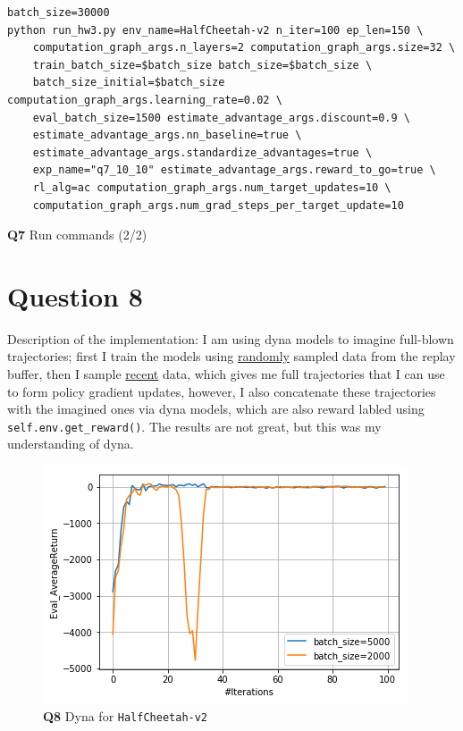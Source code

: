 \documentclass[11pt]{article}
\begin{document}
\begin{listing}[htbp]
\begin{verbatim}
batch_size=30000
python run_hw3.py env_name=HalfCheetah-v2 n_iter=100 ep_len=150 \
    computation_graph_args.n_layers=2 computation_graph_args.size=32 \
    train_batch_size=$batch_size batch_size=$batch_size \
    batch_size_initial=$batch_size computation_graph_args.learning_rate=0.02 \
    eval_batch_size=1500 estimate_advantage_args.discount=0.9 \
    estimate_advantage_args.nn_baseline=true \
    estimate_advantage_args.standardize_advantages=true \
    exp_name="q7_10_10" estimate_advantage_args.reward_to_go=true \
    rl_alg=ac computation_graph_args.num_target_updates=10 \
    computation_graph_args.num_grad_steps_per_target_update=10
\end{verbatim}
\caption{\textbf{Q7} Run commands (2/2)}
\end{listing}

\clearpage
\section{Question 8}
\label{sec:orgb553675}
Description of the implementation: I am using dyna models to imagine full-blown trajectories; first I train the models using \uline{randomly} sampled data from the replay buffer, then I sample \uline{recent} data, which gives me full trajectories that I can use to form policy gradient updates, however, I also concatenate these trajectories with the imagined ones via dyna models, which are also reward labled using \texttt{self.env.get\_reward()}. The results are not great, but this was my understanding of dyna.

\begin{figure}[htbp]
\centering
\includegraphics[width=.9\linewidth]{./8.png}
\caption{\textbf{Q8} Dyna for \texttt{HalfCheetah-v2}}
\end{figure}
\end{document}
